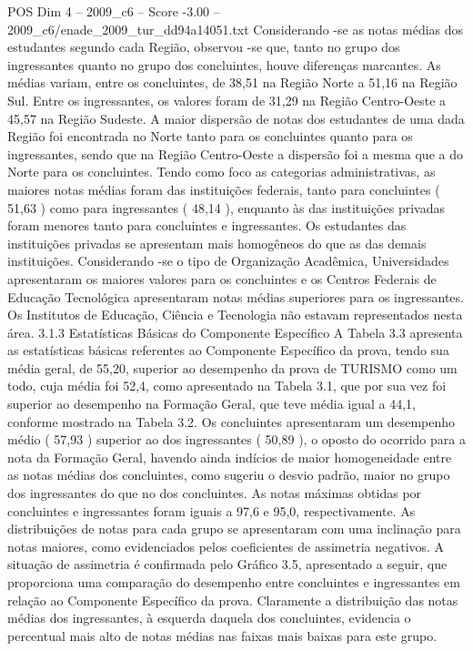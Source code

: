 \begin{textsample}{POS Dim 4 – 2009\_c6 – Score -3.00 – 2009\_c6/enade\_2009\_tur\_dd94a14051.txt}
Considerando -se as notas médias dos estudantes segundo cada Região, observou -se que, tanto no grupo dos ingressantes quanto no grupo dos concluintes, houve diferenças marcantes.
As médias variam, entre os concluintes, de 38,51 na Região Norte a 51,16 na Região Sul.
Entre os ingressantes, os valores foram de 31,29 na Região Centro-Oeste a 45,57 na Região Sudeste.
A maior dispersão de notas dos estudantes de uma dada Região foi encontrada no Norte tanto para os concluintes quanto para os ingressantes, sendo que na Região Centro-Oeste a dispersão foi a mesma que a do Norte para os concluintes.
Tendo como foco as categorias administrativas, as maiores notas médias foram das instituições federais, tanto para concluintes ( 51,63 ) como para ingressantes ( 48,14 ), enquanto às das instituições privadas foram menores tanto para concluintes e ingressantes.
Os estudantes das instituições privadas se apresentam mais homogêneos do que as das demais instituições.
Considerando -se o tipo de Organização Acadêmica, Universidades apresentaram os maiores valores para os concluintes e os Centros Federais de Educação Tecnológica apresentaram notas médias superiores para os ingressantes.
Os Institutos de Educação, Ciência e Tecnologia não estavam representados nesta área. 3.1.3 Estatísticas Básicas do Componente Específico A Tabela 3.3 apresenta as estatísticas básicas referentes ao Componente Específico da prova, tendo sua média geral, de 55,20, superior ao desempenho da prova de TURISMO como um todo, cuja média foi 52,4, como apresentado na Tabela 3.1, que por sua vez foi superior ao desempenho na Formação Geral, que teve média igual a 44,1, conforme mostrado na Tabela 3.2.
Os concluintes apresentaram um desempenho médio ( 57,93 ) superior ao dos ingressantes ( 50,89 ), o oposto do ocorrido para a nota da Formação Geral, havendo ainda indícios de maior homogeneidade entre as notas médias dos concluintes, como sugeriu o desvio padrão, maior no grupo dos ingressantes do que no dos concluintes.
As notas máximas obtidas por concluintes e ingressantes foram iguais a 97,6 e 95,0, respectivamente.
As distribuições de notas para cada grupo se apresentaram com uma inclinação para notas maiores, como evidenciados pelos coeficientes de assimetria negativos.
A situação de assimetria é confirmada pelo Gráfico 3.5, apresentado a seguir, que proporciona uma comparação do desempenho entre concluintes e ingressantes em relação ao Componente Específico da prova.
Claramente a distribuição das notas médias dos ingressantes, à esquerda daquela dos concluintes, evidencia o percentual mais alto de notas médias nas faixas mais baixas para este grupo.

\end{textsample}
